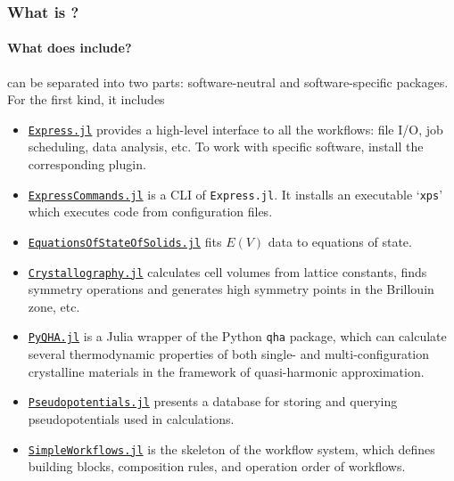 \begin{frame}[allowframebreaks]
    \frametitle{What is \express{}?}
    \framesubtitle{What does \express{} include?}

    \begin{figure}[H]
        \centering
        \label{fig:components}
    \end{figure}

    \framebreak

    \express{} can be separated into two parts: software-neutral and software-specific packages.
    For the first kind, it includes
        {\footnotesize
            \begin{itemize}
                \item \href{https://github.com/MineralsCloud/Express.jl}{\texttt{Express.jl}}
                      provides a high-level interface to all the
                      workflows: file I/O, job scheduling, data analysis, etc.
                      To work with specific software, install the corresponding plugin.
                \item \href{https://github.com/MineralsCloud/ExpressCommands.jl}{\texttt{ExpressCommands.jl}}
                      is a CLI of \texttt{Express.jl}. It installs an executable
                      `\texttt{xps}' which executes code from configuration files.
                \item \href{https://github.com/MineralsCloud/EquationsOfStateOfSolids.jl}{\texttt{EquationsOfStateOfSolids.jl}}
                      fits $E(V)$ data to equations of state.
                \item \href{https://github.com/MineralsCloud/Crystallography.jl}{\texttt{Crystallography.jl}}
                      calculates cell volumes from lattice constants, finds symmetry
                      operations and generates high symmetry points in the Brillouin zone, etc.
                \item \href{https://github.com/MineralsCloud/PyQHA.jl}{\texttt{PyQHA.jl}}
                      is a Julia wrapper of
                      the Python \texttt{qha} package, which can calculate
                      several thermodynamic properties of both single- and multi-configuration
                      crystalline materials in the framework of quasi-harmonic approximation.
                \item \href{https://github.com/MineralsCloud/Pseudopotentials.jl}{\texttt{Pseudopotentials.jl}} presents
                      a database for storing and querying pseudopotentials used in \ab{} calculations.
                \item \href{https://github.com/MineralsCloud/SimpleWorkflows.jl}{\texttt{SimpleWorkflows.jl}}
                      is the skeleton of the workflow system, which
                      defines building blocks, composition rules, and operation order of workflows.
            \end{itemize}
        }


\end{frame}

